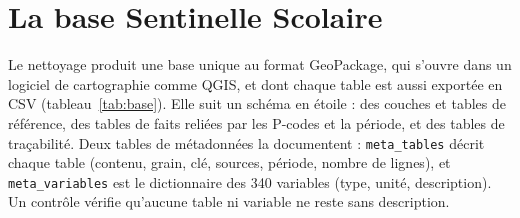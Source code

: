 \documentclass{article}
\begin{document}
\section{La base Sentinelle Scolaire}

Le nettoyage produit une base unique au format GeoPackage, qui s'ouvre dans un logiciel de cartographie comme QGIS, et dont chaque table est aussi exportée en CSV (tableau~\ref{tab:base}). Elle suit un schéma en étoile : des couches et tables de référence, des tables de faits reliées par les P-codes et la période, et des tables de traçabilité. Deux tables de métadonnées la documentent : \texttt{meta\_tables} décrit chaque table (contenu, grain, clé, sources, période, nombre de lignes), et \texttt{meta\_variables} est le dictionnaire des 340 variables (type, unité, description). Un contrôle vérifie qu'aucune table ni variable ne reste sans description.
\end{document}

